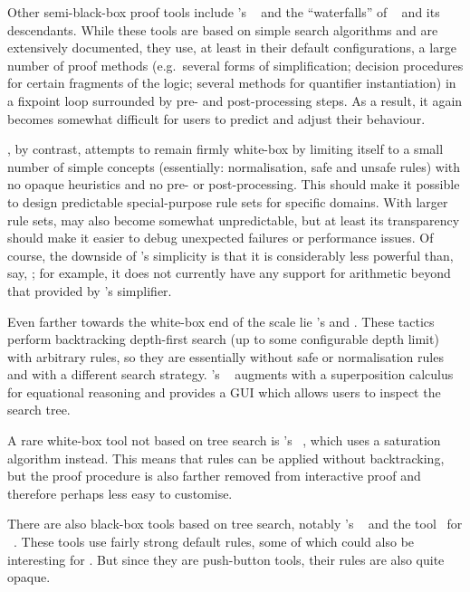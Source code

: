 Other semi-black-box proof tools include \PVS's \grind{}~\cite{PVS-tutorial} and the \enquote{waterfalls} of \ACLtwo~\cite{ACL2} and its descendants.
While these tools are based on simple search algorithms and are extensively documented, they use, at least in their default configurations, a large number of proof methods (e.g.\ several forms of simplification; decision procedures for certain fragments of the logic; several methods for quantifier instantiation) in a fixpoint loop surrounded by pre- and post-processing steps.
As a result, it again becomes somewhat difficult for users to predict and adjust their behaviour.

\Aesop, by contrast, attempts to remain firmly white-box by limiting itself to a small number of simple concepts (essentially: normalisation, safe and unsafe rules) with no opaque heuristics and no pre- or post-processing.
This should make it possible to design predictable special-purpose rule sets for specific domains.
With larger rule sets, \Aesop{} may also become somewhat unpredictable, but at least its transparency should make it easier to debug unexpected failures or performance issues.
Of course, the downside of \Aesop's simplicity is that it is considerably less powerful than, say, \grind; for example, it does not currently have any support for arithmetic beyond that provided by \Lean's simplifier.

Even farther towards the white-box end of the scale lie \Coq's \auto{} and \eauto.
These tactics perform backtracking depth-first search (up to some configurable depth limit) with arbitrary rules, so they are essentially \Aesop{} without safe or normalisation rules and with a different search strategy.
\Matita's \auto~\cite{Matita} augments \eauto{} with a superposition calculus for equational reasoning and provides a GUI which allows users to inspect the search tree.

A rare white-box tool not based on tree search is \Isabelle's \autotwo~\cite{auto2}, which uses a saturation algorithm instead.
This means that rules can be applied without backtracking, but the proof procedure is also farther removed from interactive proof and therefore perhaps less easy to customise.

There are also black-box tools based on tree search, notably \Coq's \sauto~\cite{sauto} and the \Agsy{} tool~\cite{Agsy} for \Agda~\cite{Agda}.
These tools use fairly strong default rules, some of which could also be interesting for \Aesop.
But since they are push-button tools, their rules are also quite opaque.

